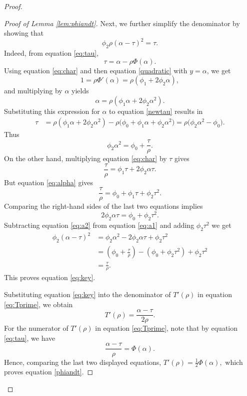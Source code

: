\documentclass[10pt,a4paper]{amsart}
\theoremstyle{remark}
\begin{document}
\begin{proof}
\begin{proof}[Proof of Lemma \ref{lem:phiandt}]
Next, we further simplify the denominator by  showing that
\begin{equation}
\phi_2\rho(\alpha-\tau)^2=\tau.
\label{eq:key}
\end{equation}
Indeed, from equation \eqref{eq:tau},
\begin{equation} \label{newtau}
\tau=\alpha-\rho\Phi(\alpha).
\end{equation}
Using equation \eqref{eq:char} and then equation \eqref{quadratic} with $y=\alpha$, we get
\begin{equation}
1=\rho\Phi'(\alpha)=\rho(\phi_1+2\phi_2\alpha),
\end{equation}
and multiplying by $\alpha$ yields
\begin{equation}
	\alpha=\rho(\phi_1 \alpha+2\phi_2\alpha^2).
\end{equation}
Substituting this expression for $\alpha$ to equation \eqref{newtau} results in
\begin{align}
\tau
&=
\rho(\phi_1 \alpha+2\phi_2\alpha^2)-\rho
\bigl(
\phi_0+\phi_1\alpha+\phi_2\alpha^2
\bigr)
=
\rho\bigl(\phi_2\alpha^2-\phi_0\bigr).
\end{align}
Thus
\begin{equation}
\phi_2\alpha^2
=
\phi_0+\frac{\tau}{\rho}.
\label{eq:a1}
\end{equation}
On the other hand, multiplying equation \eqref{eq:char} by \(\tau\) gives
\[
\frac{\tau}{\rho}
=
\phi_1\tau+2\phi_2\alpha\tau.
\]
But equation \eqref{eq:alpha} gives
\[
\frac{\tau}{\rho}
=
\phi_0+\phi_1\tau+\phi_2\tau^2.
\]
Comparing the right-hand sides of the last two equations implies
\begin{equation}
2\phi_2\alpha\tau
=
\phi_0+\phi_2\tau^2.
\label{eq:a2}
\end{equation}
Subtracting equation \eqref{eq:a2} from equation \eqref{eq:a1} and adding $\phi_2 \tau^2$ we get
\begin{align}
\phi_2(\alpha-\tau)^2
&=
\phi_2\alpha^2
-2\phi_2\alpha\tau
+\phi_2\tau^2\\
&=
\left(\phi_0+\frac{\tau}{\rho}\right)
-\left(\phi_0+\phi_2\tau^2\right)
+\phi_2\tau^2\\
&=
\frac{\tau}{\rho}.
\end{align}
This proves equation \eqref{eq:key}.

Substituting equation \eqref{eq:key} into the denominator of $T'(\rho)$ in equation \eqref{eq:Tprime}, we obtain
\[
T'(\rho)
=
\frac{\alpha-\tau}{2\rho}.
\]
For the numerator of  $T'(\rho)$ in equation \eqref{eq:Tprime}, note that by equation \eqref{eq:tau}, we have
\[
\frac{\alpha-\tau}{\rho}=\Phi(\alpha).
\]
Hence, comparing the last two displayed equations, 
$
T'(\rho)=\frac{1}{2}\Phi(\alpha),
$
which proves equation \eqref{phiandt}.
\end{proof}



\end{proof}
\end{document}
